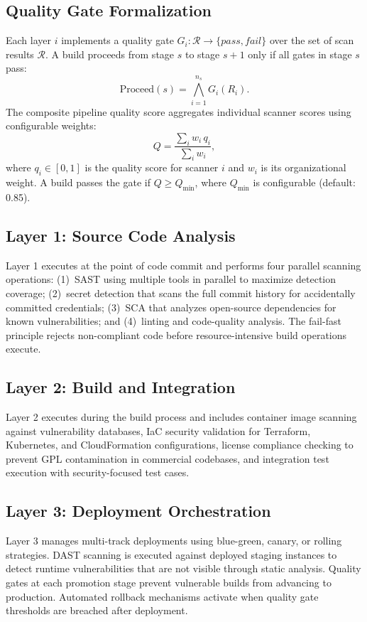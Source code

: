 \documentclass{ieeeaccess}
\begin{document}
\subsection{Quality Gate Formalization}
Each layer $i$ implements a quality gate $G_i: \mathcal{R} \rightarrow \{\textit{pass}, \textit{fail}\}$ over the set of scan results $\mathcal{R}$. A build proceeds from stage $s$ to stage $s{+}1$ only if all gates in stage $s$ pass:
\begin{equation}
\mathrm{Proceed}(s) = \bigwedge_{i=1}^{n_s} G_i(R_i).
\label{eq:proceed}
\end{equation}
The composite pipeline quality score aggregates individual scanner scores using configurable weights:
\begin{equation}
Q = \frac{\sum_{i} w_i\, q_i}{\sum_{i} w_i},
\label{eq:composite}
\end{equation}
where $q_i \in [0, 1]$ is the quality score for scanner $i$ and $w_i$ is its organizational weight. A build passes the gate if $Q \geq Q_{\min}$, where $Q_{\min}$ is configurable (default: 0.85).

\subsection{Layer 1: Source Code Analysis}
Layer 1 executes at the point of code commit and performs four parallel scanning operations: (1)~SAST using multiple tools in parallel to maximize detection coverage; (2)~secret detection that scans the full commit history for accidentally committed credentials; (3)~SCA that analyzes open-source dependencies for known vulnerabilities; and (4)~linting and code-quality analysis. The fail-fast principle rejects non-compliant code before resource-intensive build operations execute.

\subsection{Layer 2: Build and Integration}
Layer 2 executes during the build process and includes container image scanning against vulnerability databases, IaC security validation for Terraform, Kubernetes, and CloudFormation configurations, license compliance checking to prevent GPL contamination in commercial codebases, and integration test execution with security-focused test cases.

\subsection{Layer 3: Deployment Orchestration}
Layer 3 manages multi-track deployments using blue-green, canary, or rolling strategies. DAST scanning is executed against deployed staging instances to detect runtime vulnerabilities that are not visible through static analysis. Quality gates at each promotion stage prevent vulnerable builds from advancing to production. Automated rollback mechanisms activate when quality gate thresholds are breached after deployment.
\end{document}
